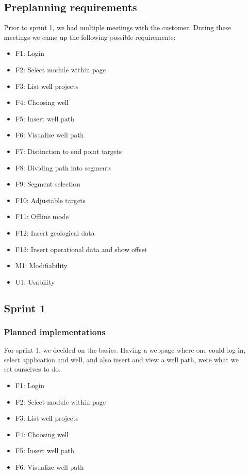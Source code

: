 \documentclass{report}
\begin{document}
\subsection{Preplanning requirements} \label{sec:preplanning_requirementsevolution}
Prior to sprint 1, we had multiple meetings with the customer. During these meetings we came up the following possible requirements: 
\begin{itemize}
    \item F1: Login
    \item F2: Select module within page
    \item F3: List well projects
    \item F4: Choosing well
    \item F5: Insert well path
    \item F6: Visualize well path
    \item F7: Distinction to end point targets
    \item F8: Dividing path into segments
    \item F9: Segment selection
    \item F10: Adjustable targets
    \item F11: Offline mode
    \item F12: Insert geological data
    \item F13: Insert operational data and show offset
    \item M1: Modifiability
    \item U1: Usability
\end{itemize}

\subsection{Sprint 1} \label{sec:sprint1_requirementsevolution}

\subsubsection{Planned implementations}
For sprint 1, we decided on the basics. Having a webpage where one could log in, select application and well, and also insert and view a well path, were what we set ourselves to do.

\begin{itemize}
    \item F1: Login
    \item F2: Select module within page
    \item F3: List well projects
    \item F4: Choosing well
    \item F5: Insert well path
    \item F6: Visualize well path
\end{itemize}
\end{document}
